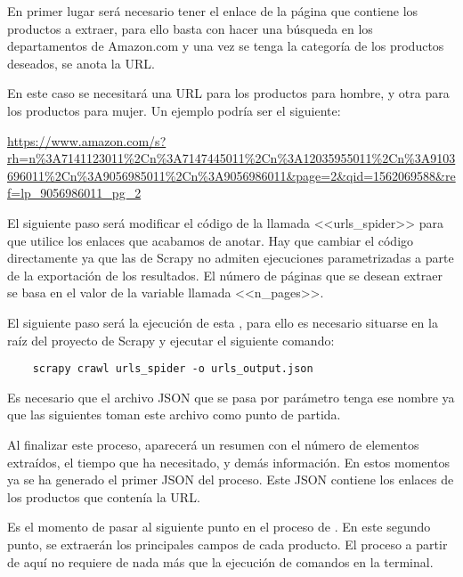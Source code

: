 En primer lugar será necesario tener el enlace de la página que contiene los productos a extraer, para ello basta con hacer una búsqueda en los departamentos de Amazon.com y una vez se tenga la categoría de los productos deseados, se anota la URL.


En este caso se necesitará una URL para los productos para hombre, y otra para los productos para mujer. Un ejemplo podría ser el siguiente:

\url{https://www.amazon.com/s?rh=n\%3A7141123011\%2Cn\%3A7147445011\%2Cn\%3A12035955011\%2Cn\%3A9103696011\%2Cn\%3A9056985011\%2Cn\%3A9056986011&page=2&qid=1562069588&ref=lp_9056986011_pg_2}

El siguiente paso será modificar el código de la  llamada <<urls\_spider>> para que utilice los enlaces que acabamos de anotar. Hay que cambiar el código directamente ya que las  de Scrapy no admiten ejecuciones parametrizadas a parte de la exportación de los resultados. El número de páginas que se desean extraer se basa en el valor de la variable llamada <<n\_pages>>.


El siguiente paso será la ejecución de esta , para ello es necesario situarse en la raíz del proyecto de Scrapy y ejecutar el siguiente comando:
\begin{verbatim}
    scrapy crawl urls_spider -o urls_output.json
\end{verbatim}

Es necesario que el archivo JSON que se pasa por parámetro tenga ese nombre ya que las siguientes  toman este archivo como punto de partida.


Al finalizar este proceso, aparecerá un resumen con el número de elementos extraídos, el tiempo que ha necesitado, y demás información. En estos momentos ya se ha generado el primer JSON del proceso. Este JSON contiene los enlaces de los productos que contenía la URL.


Es el momento de pasar al siguiente punto en el proceso de . En este segundo punto, se extraerán los principales campos de cada producto. El proceso a partir de aquí no requiere de nada más que la ejecución de comandos en la terminal.

